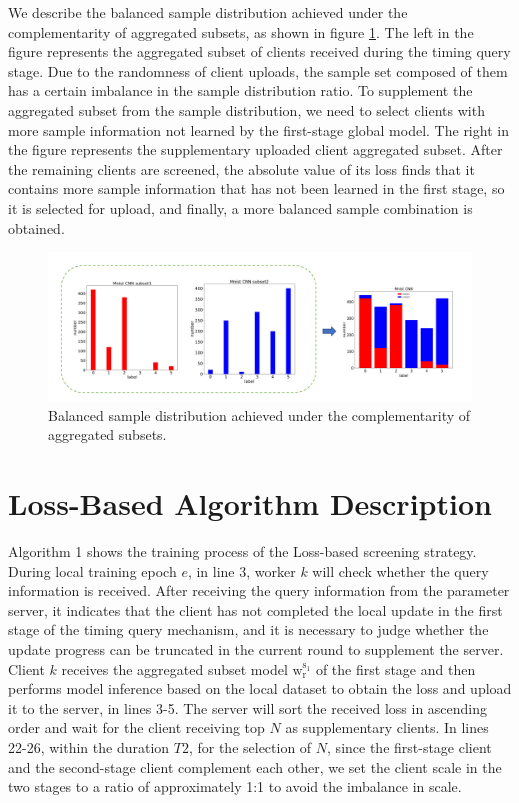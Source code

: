 \documentclass{article}
\begin{document}
We describe the balanced sample distribution achieved under the complementarity of aggregated subsets, as shown in figure \ref{fig9}. The left in the figure represents the aggregated subset of clients received during the timing query stage. Due to the randomness of client uploads, the sample set composed of them has a certain imbalance in the sample distribution ratio. To supplement the aggregated subset from the sample distribution, we need to select clients with more sample information not learned by the first-stage global model. The right in the figure represents the supplementary uploaded client aggregated subset. After the remaining clients are screened, the absolute value of its loss finds that it contains more sample information that has not been learned in the first stage, so it is selected for upload, and finally, a more balanced sample combination is obtained. 

\begin{figure}[!htbp]
\vspace{-0.4cm} 
	\centering
	\includegraphics[width=5.5in]{fig9.png}
	\caption{Balanced sample distribution achieved under the complementarity of aggregated subsets.}
	\label{fig9}
\end{figure}
\vspace{-0.3cm}


\section{Loss-Based Algorithm Description}\label{section1.2}
Algorithm 1 shows the training process of the Loss-based screening strategy. During local training epoch $e$, in line 3, worker $k$ will check whether the query information is received. After receiving the query information from the parameter server, it indicates that the client has not completed the local update in the first stage of the timing query mechanism, and it is necessary to judge whether the update progress can be truncated in the current round to supplement the server. Client $k$ receives the aggregated subset model $\mathrm{w}_{\mathrm{r}}^{\mathrm{s}_{1}}$ of the first stage and then performs model inference based on the local dataset to obtain the loss and upload it to the server, in lines 3-5.  The server will sort the received loss in ascending order and wait for the client receiving top $N$ as supplementary clients. In lines 22-26, within the duration $T2$, for the selection of $N$, since the first-stage client and the second-stage client complement each other, we set the client scale in the two stages to a ratio of approximately 1:1 to avoid the imbalance in scale. 
\end{document}
